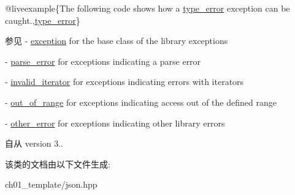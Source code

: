 @liveexample\{The following code shows how a {\ttfamily \mbox{\hyperlink{classnlohmann_1_1detail_1_1type__error}{type\+\_\+error}}} exception can be caught.,\mbox{\hyperlink{classnlohmann_1_1detail_1_1type__error}{type\+\_\+error}}\}

\begin{DoxySeeAlso}{参见}
-\/ \mbox{\hyperlink{classnlohmann_1_1detail_1_1exception}{exception}} for the base class of the library exceptions 

-\/ \mbox{\hyperlink{classnlohmann_1_1detail_1_1parse__error}{parse\+\_\+error}} for exceptions indicating a parse error 

-\/ \mbox{\hyperlink{classnlohmann_1_1detail_1_1invalid__iterator}{invalid\+\_\+iterator}} for exceptions indicating errors with iterators 

-\/ \mbox{\hyperlink{classnlohmann_1_1detail_1_1out__of__range}{out\+\_\+of\+\_\+range}} for exceptions indicating access out of the defined range 

-\/ \mbox{\hyperlink{classnlohmann_1_1detail_1_1other__error}{other\+\_\+error}} for exceptions indicating other library errors
\end{DoxySeeAlso}
\begin{DoxySince}{自从}
version 3.. 
\end{DoxySince}


该类的文档由以下文件生成\+:\begin{DoxyCompactItemize}
\item 
ch01\+\_\+template/json.\+hpp\end{DoxyCompactItemize}
